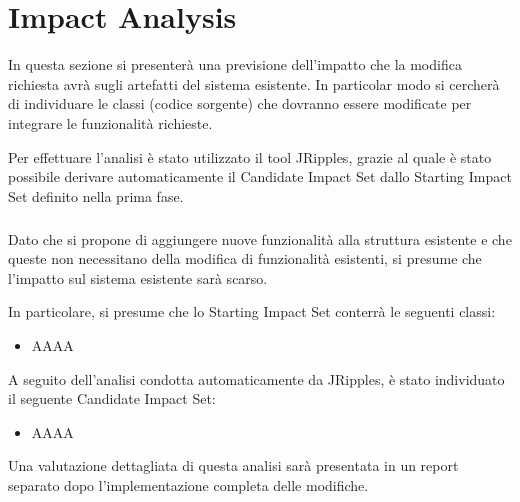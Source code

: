\chapter{Impact Analysis}
In questa sezione si presenterà una previsione dell'impatto che la modifica richiesta avrà sugli artefatti del sistema esistente. In particolar modo si cercherà di individuare le classi (codice sorgente) che dovranno essere modificate per integrare le funzionalità richieste.

Per effettuare l'analisi è stato utilizzato il tool JRipples, grazie al quale è stato possibile derivare automaticamente il Candidate Impact Set dallo Starting Impact Set definito nella prima fase. 

\paragraph{}
Dato che si propone di aggiungere nuove funzionalità alla struttura esistente e che queste non necessitano della modifica di funzionalità esistenti, si presume che l'impatto sul sistema esistente sarà scarso. 

In particolare, si presume che lo Starting Impact Set conterrà le seguenti classi:
\begin{itemize}
\item AAAA 
\end{itemize}

A seguito dell'analisi condotta automaticamente da JRipples, è stato individuato il seguente Candidate Impact Set:
\begin{itemize}
\item AAAA
\end{itemize}

Una valutazione dettagliata di questa analisi sarà presentata in un report separato dopo l'implementazione completa delle modifiche.